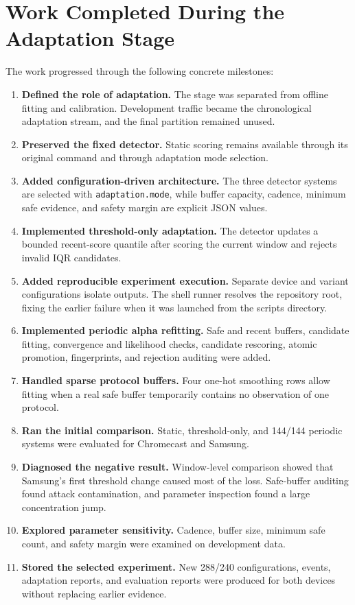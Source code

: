 \documentclass[11pt,a4paper]{article}
\begin{document}
\section{Work Completed During the Adaptation Stage}

The work progressed through the following concrete milestones:

\begin{enumerate}
  \item \textbf{Defined the role of adaptation.} The stage was separated from
  offline fitting and calibration. Development traffic became the chronological
  adaptation stream, and the final partition remained unused.
  \item \textbf{Preserved the fixed detector.} Static scoring remains available
  through its original command and through adaptation mode selection.
  \item \textbf{Added configuration-driven architecture.} The three detector
  systems are selected with \texttt{adaptation.mode}, while buffer capacity,
  cadence, minimum safe evidence, and safety margin are explicit JSON values.
  \item \textbf{Implemented threshold-only adaptation.} The detector updates a
  bounded recent-score quantile after scoring the current window and rejects
  invalid IQR candidates.
  \item \textbf{Added reproducible experiment execution.} Separate device and
  variant configurations isolate outputs. The shell runner resolves the
  repository root, fixing the earlier failure when it was launched from the
  scripts directory.
  \item \textbf{Implemented periodic alpha refitting.} Safe and recent buffers,
  candidate fitting, convergence and likelihood checks, candidate rescoring,
  atomic promotion, fingerprints, and rejection auditing were added.
  \item \textbf{Handled sparse protocol buffers.} Four one-hot smoothing rows
  allow fitting when a real safe buffer temporarily contains no observation of
  one protocol.
  \item \textbf{Ran the initial comparison.} Static, threshold-only, and
  144/144 periodic systems were evaluated for Chromecast and Samsung.
  \item \textbf{Diagnosed the negative result.} Window-level comparison showed
  that Samsung's first threshold change caused most of the loss. Safe-buffer
  auditing found attack contamination, and parameter inspection found a large
  concentration jump.
  \item \textbf{Explored parameter sensitivity.} Cadence, buffer size, minimum
  safe count, and safety margin were examined on development data.
  \item \textbf{Stored the selected experiment.} New 288/240 configurations,
  events, adaptation reports, and evaluation reports were produced for both
  devices without replacing earlier evidence.
\end{enumerate}
\end{document}

